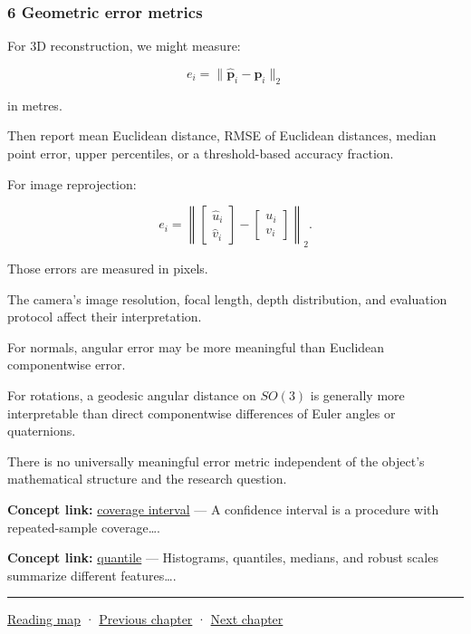 \subsubsection{6 Geometric error metrics}\label{02-foundations-ii-ch030-geometric-error-metrics}

For 3D reconstruction, we might measure:

\[
 e_i=\|\hat{\mathbf p}_i-\mathbf p_i\|_2
\]

in metres.

Then report mean Euclidean distance, RMSE of Euclidean distances, median point error, upper percentiles, or a threshold-based accuracy fraction.

For image reprojection:

\[
 e_i= \left\| \begin{bmatrix}\hat u_i\\\hat v_i\end{bmatrix} - \begin{bmatrix}u_i\\v_i\end{bmatrix} \right\|_2.
\]

Those errors are measured in pixels.

The camera's image resolution, focal length, depth distribution, and evaluation protocol affect their interpretation.

For normals, angular error may be more meaningful than Euclidean componentwise error.

For rotations, a geodesic angular distance on \(SO(3)\) is generally more interpretable than direct componentwise differences of Euler angles or quaternions.

There is no universally meaningful error metric independent of the object's mathematical structure and the research question.

\textbf{Concept link:} \hyperref[02-foundations-ii-ch030-inference-and-error-metrics-need-explicit-assumptions]{coverage interval} --- A confidence interval is a procedure with repeated-sample coverage\ldots.

\textbf{Concept link:} \hyperref[02-foundations-ii-ch030-inference-and-error-metrics-need-explicit-assumptions]{quantile} --- Histograms, quantiles, medians, and robust scales summarize different features\ldots.

\begin{center}\rule{0.5\linewidth}{0.5pt}\end{center}

\hyperref[volume-reading-map]{Reading map} · \hyperref[02-foundations-ii-ch029]{Previous chapter} · \hyperref[02-foundations-ii-ch031]{Next chapter}

